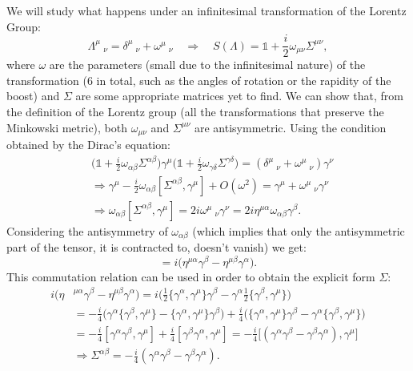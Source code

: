 We will study what happens under an infinitesimal transformation of the Lorentz Group:
\begin{equation*}
    \Lambda^\mu\ _\nu=\delta^\mu\ _\nu+\omega^\mu\ _\nu\quad\Rightarrow\quad S(\Lambda)=\mathds{1}+\frac{i}{2}\omega_{\mu\nu}\Sigma^{\mu\nu},
\end{equation*}
where $\omega$ are the parameters (small due to the infinitesimal nature) of the transformation (6 in total, such as the angles of rotation or the rapidity of the boost) and $\Sigma$ are some appropriate matrices yet to find. We can show that, from the definition of the Lorentz group (all the transformations that preserve the Minkowski metric), both $\omega_{\mu\nu}$ and $\Sigma^{\mu\nu}$ are antisymmetric. Using the condition obtained by the Dirac's equation:
\begin{align*}
   &\bigg( \mathds{1}+\frac{i}{2}\omega_{\alpha\beta}\Sigma^{\alpha\beta}\bigg)\gamma^\mu\bigg( \mathds{1}+\frac{i}{2}\omega_{\gamma\delta}\Sigma^{\gamma\delta}\bigg)=(\delta^\mu\ _\nu+\omega^\mu\ _\nu)\gamma^\nu\\
   &\Rightarrow\gamma^\mu-\frac{i}{2}\omega_{\alpha\beta}[\Sigma^{\alpha\beta},\gamma^\mu]+O(\omega^2)=\gamma^\mu+\omega^\mu\ _\nu\gamma^\nu\\
   &\Rightarrow\omega_{\alpha\beta}[\Sigma^{\alpha\beta},\gamma^\mu]=2i\omega^\mu\ _\nu\gamma^\nu=2i\eta^{\mu\alpha}\omega_{\alpha\beta}\gamma^\beta.
\end{align*} 
Considering the antisymmetry of $\omega_{\alpha\beta}$ (which implies that only the antisymmetric part of the tensor, it is contracted to, doesn't vanish) we get:
\begin{equation*}
    [\Sigma^{\alpha\beta},\gamma^\mu]=i\big(\eta^
    {\mu\alpha}\gamma^\beta-\eta^{\mu\beta}\gamma^\alpha\big).
\end{equation*}
This commutation relation can be used in order to obtain the explicit form $\Sigma$:
\begin{align*}
    i\big(\eta&^{\mu\alpha}\gamma^\beta-\eta^{\mu\beta}\gamma^\alpha\big)=i\bigg(\frac{1}{2}\{\gamma^\alpha,\gamma^\mu\}\gamma^\beta-\gamma^\alpha\frac{1}{2}\{\gamma^\beta,\gamma^\mu\}\bigg)\\&=-\frac{i}{4}\bigg(\gamma^\alpha\{\gamma^\beta,\gamma^\mu\}-\{\gamma^\alpha,\gamma^\mu\}\gamma^\beta\bigg)+\frac{i}{4}\bigg(\{\gamma^\alpha,\gamma^\mu\}\gamma^\beta-\gamma^\alpha\{\gamma^\beta,\gamma^\mu\}\bigg)\\&=-\frac{i}{4}[\gamma^\alpha\gamma^\beta,\gamma^\mu]+\frac{i}{4}[\gamma^\beta\gamma^\alpha,\gamma^\mu]=-\frac{i}{4}\bigg[(\gamma^\alpha\gamma^\beta-\gamma^\beta\gamma^\alpha),\gamma^\mu\bigg]\\
    &\Rightarrow\Sigma^{\alpha\beta}=-\frac{i}{4}(\gamma^\alpha\gamma^\beta-\gamma^\beta\gamma^\alpha).
\end{align*}
